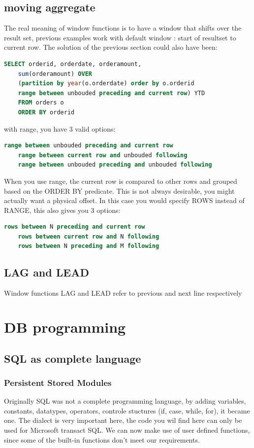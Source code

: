 \documentclass{report}
\begin{document}
	\section{moving aggregate}
	The real meaning of window functions is to have a window that shifts over the result set, previous examples work with default window : start of resultset to current row. The solution of the previous section could also have been: 
	\begin{lstlisting}[language=sql]
	SELECT orderid, orderdate, orderamount,
	sum(orderamount) OVER 
	(partition by year(o.orderdate) order by o.orderid
	range between unbouded preceding and current row) YTD
	FROM orders o
	ORDER BY orderid	\end{lstlisting}
	with range, you have 3 valid options: 
	\begin{lstlisting}[language = sql]
	range between unbouded preceding and current row
	range between current row and unbouded following
	range between unbouded preceding and unbouded following	\end{lstlisting}
	When you use range, the current row is compared to other rows and grouped based on the ORDER BY predicate. This is not always desirable, you might actually want a physical offset. In this case you would specify ROWS instead of RANGE, this also gives you 3 options: 
	\begin{lstlisting}[language = sql]
	rows between N preceding and current row
	rows between current row and N following
	rows between N preceding and M following	\end{lstlisting}
	
	\section{LAG and LEAD}
	Window functions LAG and LEAD refer to previous and next line respectively
	\chapter{DB programming}
	\section{SQL as complete language}
	\subsection{Persistent Stored Modules}
	Originally SQL was not a complete programming language, by adding variables, constants, datatypes, operators, controle stuctures (if, case, while, for), it became one. The dialect is very important here, the code you wil find here can only be used for Microsoft transact SQL. We can now make use of user defined functions, since some of the built-in functions don't meet our requirements.
\end{document}
